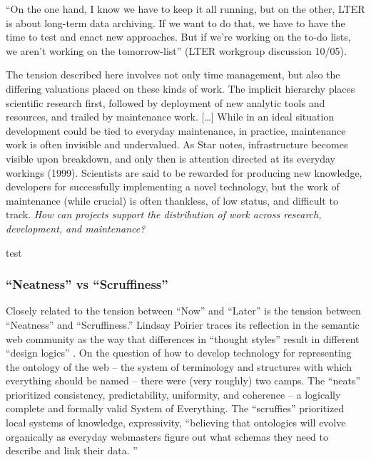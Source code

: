 \documentclass[10pt]{article}
\begin{document}
\begin{multicols}{2}
\begin{leftbar}
``On the one hand, I know we have to keep it all running, but on the
other, LTER is about long-term data archiving. If we want to do that, we
have to have the time to test and enact new approaches. But if we're
working on the to-do lists, we aren't working on the tomorrow-list''
(LTER workgroup discussion 10/05).

The tension described here involves not only time management, but also
the differing valuations placed on these kinds of work. The implicit
hierarchy places scientific research first, followed by deployment of
new analytic tools and resources, and trailed by maintenance work.
{[}\ldots{]} While in an ideal situation development could be tied to
everyday maintenance, in practice, maintenance work is often invisible
and undervalued. As Star notes, infrastructure becomes visible upon
breakdown, and only then is attention directed at its everyday workings
(1999). Scientists are said to be rewarded for producing new knowledge,
developers for successfully implementing a novel technology, but the
work of maintenance (while crucial) is often thankless, of low status,
and difficult to track. \emph{How can projects support the distribution
of work across research, development, and maintenance?} \cite{ribesLongNowTechnology2009} 
\end{leftbar}

\cite{gawerBridgingDifferingPerspectives2014} 

test

\hypertarget{neatness-vs-scruffiness}{%
\subsubsection{``Neatness'' vs
``Scruffiness''}\label{neatness-vs-scruffiness}}

Closely related to the tension between ``Now'' and ``Later'' is the
tension between ``Neatness'' and ``Scruffiness.'' Lindsay Poirier traces
its reflection in the semantic web community as the way that differences
in ``thought styles'' result in different ``design logics'' \cite{poirierTurnScruffyEthnographic2017} . On the question of how to
develop technology for representing the ontology of the web -- the
system of terminology and structures with which everything should be
named -- there were (very roughly) two camps. The ``neats'' prioritized
consistency, predictability, uniformity, and coherence -- a logically
complete and formally valid System of Everything. The ``scruffies''
prioritized local systems of knowledge, expressivity, ``believing that
ontologies will evolve organically as everyday webmasters figure out
what schemas they need to describe and link their data. \cite{poirierTurnScruffyEthnographic2017} ''


\end{multicols}
\end{document}
